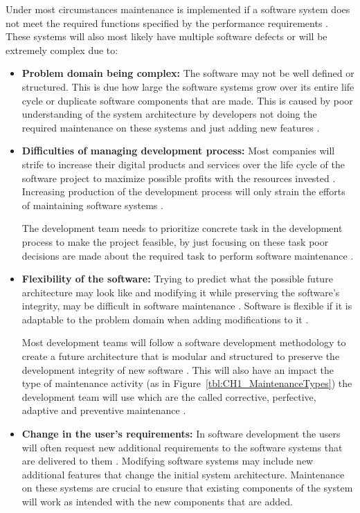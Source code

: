 Under most circumstances maintenance is implemented if a software system does not meet the required functions specified by the performance requirements \cite{Ogheneovo2014, Sneed2004}. These systems will also most likely have multiple software defects or will be extremely complex due to:
\begin{itemize}
    \item \textbf{Problem domain being complex:} The software may not be well defined or structured. This is due how large the software systems grow over its entire life cycle or duplicate software components that are made. This is caused by poor understanding of the system architecture by developers not doing the required maintenance on these systems and just adding new features \cite{Galster2019, Booch1986}.
    \item \textbf{Difficulties of managing development process:} Most companies will strife to increase their digital products and services over the life cycle of the software project to maximize possible profits with the resources invested \cite{Niu2018}. Increasing production of the development process will only strain the efforts of maintaining software systems \cite{Sneed2004}.\par The development team needs to prioritize concrete task in the development process to make the project feasible, by just focusing on these task poor decisions are made about the required task to perform software maintenance \cite{Galster2019, Ogheneovo2014, Lenarduzzi2017}. 
    \item \textbf{Flexibility of the software:} Trying to predict what the possible future architecture may look like and modifying it while preserving the software's integrity, may be difficult in software maintenance \cite{Garlan1999}. Software is flexible if it is adaptable to the problem domain when adding modifications to it \cite{Ogheneovo2014}.\par Most development teams will follow a software development methodology to create a future architecture that is modular and structured to preserve the development integrity of new software \cite{Vijayasarathy2016, Rehman2018}. This will also have an impact the type of maintenance activity (as in Figure~\ref{tbl:CH1_MaintenanceTypes}) the development team will use which are the called corrective, perfective, adaptive and preventive maintenance \cite{FrancisThamburaj2017,Hasan2012,Stojanov2017,Snipes2018}.
    \item \textbf{Change in the user's requirements:} In software development the users will often request new additional requirements to the software systems that are delivered to them \cite{Ogheneovo2014}. Modifying software systems may include new additional features that change the initial system architecture. Maintenance on these systems are crucial to ensure that existing components of the system will work as intended with the new components that are added.
\end{itemize}

